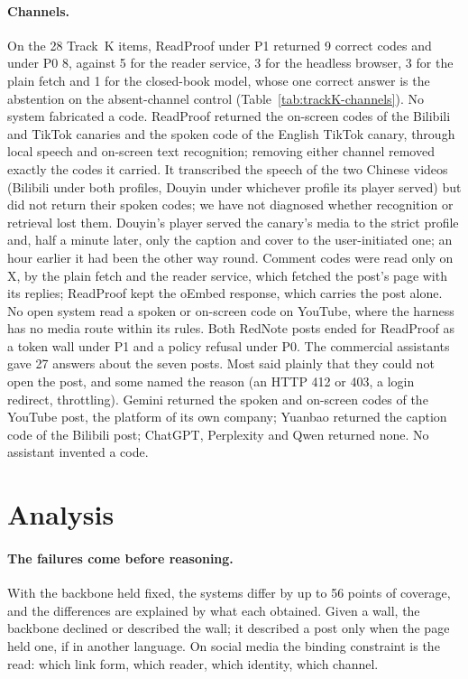 

\paragraph{Channels.}
On the 28 Track~K items, ReadProof under P1 returned 9 correct codes and under P0 8, against 5 for the reader
service, 3 for the headless browser, 3 for the plain fetch and 1 for the closed-book model, whose one correct answer
is the abstention on the absent-channel control (Table~\ref{tab:trackK-channels}). No system fabricated a code.
ReadProof returned the on-screen codes of the Bilibili and TikTok canaries and the spoken code of the English TikTok
canary, through local speech and on-screen text recognition; removing either channel removed exactly the codes it
carried. It transcribed the speech of the two Chinese videos (Bilibili under both profiles, Douyin under whichever profile its player served) but did
not return their spoken codes; we have not diagnosed whether recognition or retrieval lost them. Douyin's player
served the canary's media to the strict profile and, half a minute later, only the caption and cover to the
user-initiated one; an hour earlier it had been the other way round. Comment codes were read only on X, by the plain
fetch and the reader service, which fetched the post's page with its replies; ReadProof kept the oEmbed response,
which carries the post alone. No open system read a spoken or on-screen code on YouTube, where the harness has no media
route within its rules. Both RedNote posts ended for ReadProof as a token wall under P1 and a policy refusal under P0.
The commercial assistants gave 27 answers about the seven posts. Most said plainly that they could not open the post,
and some named the reason (an HTTP 412 or 403, a login redirect, throttling). Gemini returned the spoken and
on-screen codes of the YouTube post, the platform of its own company; Yuanbao returned the caption code of the
Bilibili post; ChatGPT, Perplexity and Qwen returned none. No assistant invented a code.

\section{Analysis}\label{sec:analysis}

\paragraph{The failures come before reasoning.}
With the backbone held fixed, the systems differ by up to 56 points of coverage, and the differences are explained by
what each obtained. Given a wall, the backbone declined or described the wall; it described a post only when the page
held one, if in another language. On social media the binding constraint is the read: which link form, which reader,
which identity, which channel.


